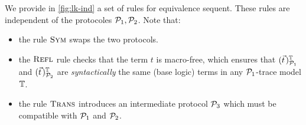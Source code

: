 


We provide in \cref{fig:lk-ind} a set of rules for equivalence sequent. These rules are independent of the protocoles $\mathcal{P}_1,\mathcal{P}_2$. Note that:
\begin{itemize}
\item the rule $\textsc{Sym}$ swaps the two protocols.
\item the $\textsc{Refl}$ rule checks that the term $t$ is macro-free, which ensures that $\interp{\pvec{t}}{\TM}{\calp_1}$ and $\interp{\pvec{t}}{\TM}{\calp_2}$ are \emph{syntactically} the same (base logic) terms in any $\mathcal{P}_1$-trace model $\mathbb{T}$.
\item the rule $\textsc{Trans}$ introduces an intermediate protocol $\mathcal{P}_3$ which must be compatible with $\mathcal{P}_1$ and $\mathcal{P}_2$.
\end{itemize}


